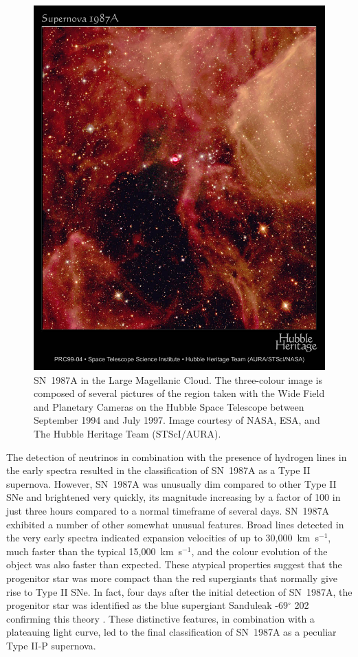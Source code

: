 \begin{figure}
\centering
\includegraphics[clip=true,scale=0.6,trim= 20 80 20 40]{chapters/chapter5/images/87A_image.jpg}
\caption{SN~1987A in the Large Magellanic Cloud.  The three-colour image is composed of several pictures of the region taken with the Wide Field and Planetary Cameras on the Hubble Space Telescope between September 1994 and July 1997.  Image courtesy of NASA, ESA, and The Hubble Heritage Team (STScI/AURA).}
\label{87A_img}
\end{figure}

The detection of neutrinos in combination with the presence of hydrogen lines in the early spectra resulted in the classification of SN~1987A as a Type II supernova.  However, SN~1987A was unusually dim compared to other Type II SNe and brightened very quickly, its magnitude increasing by a factor of 100 in just three hours compared to a normal timeframe of several days.  SN~1987A exhibited a number of other somewhat unusual features. Broad lines detected in the very early spectra indicated expansion velocities of up to 30,000~km~s$^{-1}$, much faster than the typical 15,000~km~s$^{-1}$, and the colour evolution of the object was also faster than  expected.  These atypical properties suggest that the progenitor star was more compact than the red supergiants that normally give rise to Type II SNe.  In fact, four days after the initial detection of SN~1987A, the progenitor star was identified as the blue supergiant Sanduleak -69$^{\circ}$ 202  confirming this theory \citep{Sonneborn1987}.  These distinctive features, in combination with a plateauing light curve, led to the final classification of SN~1987A as a peculiar Type II-P supernova. 

